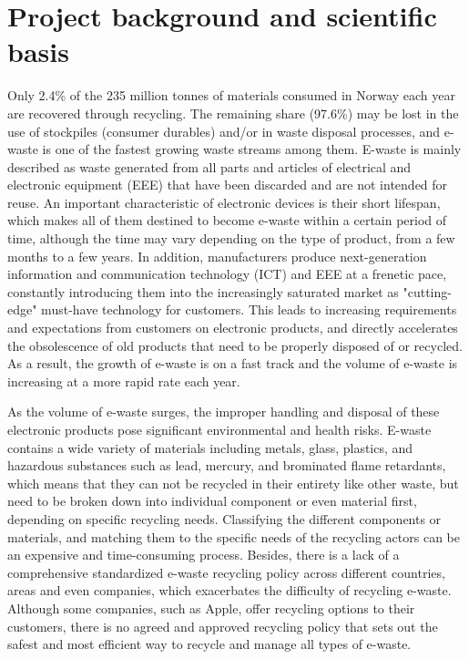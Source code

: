 \documentclass{article}
\numberwithin{equation}{section}
\begin{document}
\section{Project background and scientific basis}
Only 2.4\% of the 235 million tonnes of materials consumed in Norway each year are recovered through recycling. The remaining share (97.6\%) may be lost in the use of stockpiles (consumer durables) and/or in waste disposal processes, and e-waste is one of  the fastest growing waste streams among them. E-waste is mainly described as waste generated from all parts and articles of electrical and electronic equipment (EEE) that have been discarded and are not intended for reuse. An important characteristic of electronic devices is their short lifespan, which makes all of them destined to become e-waste within a certain period of time, although the time may vary depending on the type of product, from a few months to a few years. In addition, manufacturers produce next-generation information and communication technology (ICT) and EEE at a frenetic pace, constantly introducing them into the increasingly saturated market as "cutting-edge" must-have technology for customers. This leads to increasing requirements and expectations from customers on electronic products, and directly accelerates the obsolescence of old products that need to be properly disposed of or recycled. As a result, the growth of e-waste\cite{Forti20} is on a fast track and the volume of e-waste is increasing at a more rapid rate each year.

As the volume of e-waste surges, the improper handling and disposal \cite{Shaha22}of these electronic products pose significant environmental and health risks. E-waste contains a wide variety of materials including metals, glass, plastics, and hazardous substances such as lead, mercury, and brominated flame retardants, which means that they can not be recycled in their entirety like other waste, but need to be broken down into individual component or even material first, depending on specific recycling needs. Classifying the different components or materials, and matching them to the specific needs of the recycling actors can be an expensive and time-consuming process. Besides, there is a lack of a comprehensive standardized e-waste recycling policy\cite{why22} across different countries, areas and even companies, which exacerbates the difficulty of recycling e-waste. Although some companies, such as Apple, offer recycling options to their customers, there is no agreed and approved recycling policy that sets out the safest and most efficient way to recycle and manage all types of e-waste. 
\end{document}
